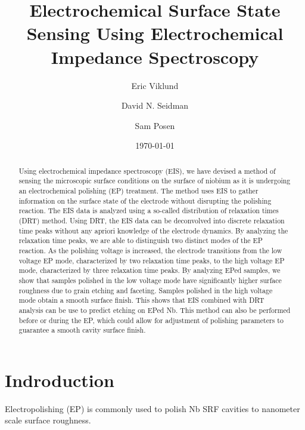 \documentclass[reprint,amsmath,amssymb,aps]{revtex4-2}%
\begin{document}
%
\normalsize%
\title{Electrochemical Surface State Sensing Using Electrochemical Impedance Spectroscopy}%
\author{Eric Viklund}%
%
%
\author{David N. Seidman}%
%
\author{Sam Posen}%
%
\date{\today}%

\begin{abstract}%
    Using electrochemical impedance spectroscopy (EIS), we have devised a method of sensing the microscopic surface conditions on the surface of niobium as it is undergoing an electrochemical polishing (EP) treatment. The method uses EIS to gather information on the surface state of the electrode without disrupting the polishing reaction. The EIS data is analyzed using a so-called distribution of relaxation times (DRT) method. Using DRT, the EIS data can be deconvolved into discrete relaxation time peaks without any apriori knowledge of the electrode dynamics. By analyzing the relaxation time peaks, we are able to distinguish two distinct modes of the EP reaction. As the polishing voltage is increased, the electrode transitions from the low voltage EP mode, characterized by two relaxation time peaks, to the high voltage EP mode, characterized by three relaxation time peaks. By analyzing EPed samples, we show that samples polished in the low voltage mode have significantly higher surface roughness due to grain etching and faceting. Samples polished in the high voltage mode obtain a smooth surface finish. This shows that EIS combined with DRT analysis can be use to predict etching on EPed Nb. This method can also be performed before or during the EP, which could allow for adjustment of polishing parameters to guarantee a smooth cavity surface finish.
\end{abstract}%

\maketitle%

\section{Indroduction}\label{sec:introduction}
    Electropolishing (EP) is commonly used to polish Nb SRF cavities to nanometer scale surface roughness. 
\end{document}
